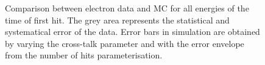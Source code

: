 \begin{figure}[htbp]
	\hfill
	\caption[]{Comparison between electron data and MC for all energies of the time of first hit. The grey area represents the statistical and systematical error of the data. Error bars in simulation are obtained by varying the cross-talk parameter and with the error envelope from the number of hits parameterisation.}
	\label{fig:sim_data_elec}
\end{figure}

